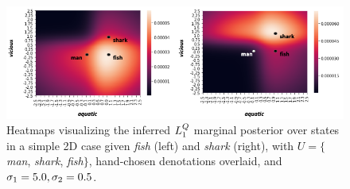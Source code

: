 \documentclass[9pt,twocolumn,twoside,lineno]{pnas-new}
\newcommand{\Listener}{L}
\newcommand{\QLONE}{\Listener_{{1}}^{{Q}}}
\begin{document}
	\begin{figure}

	\centering

	\includegraphics[width=\textwidth]{images/bothheatmaps.png}








	\caption{Heatmaps visualizing the inferred $\protect\QLONE$ marginal posterior over states in a simple 2D case given \emph{fish} (left) and \emph{shark} (right), with $U = \{$\emph{man}, \emph{shark}, \emph{fish}$\}$, hand-chosen denotations overlaid, and $\protect\sigma\protect_1=5.0, \protect\sigma\protect_2=0.5$.}


	\label{l1heatmaps}

	\end{figure}
 






		

\end{document}
